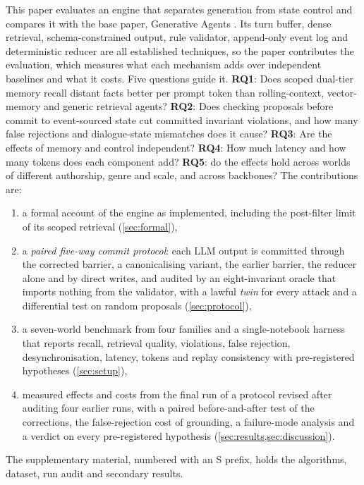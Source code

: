 \documentclass[letterpaper,journal]{IEEEtran}
\begin{document}
This paper evaluates an engine that separates generation from state control and compares it with the base paper, Generative Agents \cite{park2023generative}. Its turn buffer, dense retrieval, schema-constrained output, rule validator, append-only event log and deterministic reducer are all established techniques, so the paper contributes the evaluation, which measures what each mechanism adds over independent baselines and what it costs. Five questions guide it. \textbf{RQ1}: Does scoped dual-tier memory recall distant facts better per prompt token than rolling-context, vector-memory and generic retrieval agents? \textbf{RQ2}: Does checking proposals before commit to event-sourced state cut committed invariant violations, and how many false rejections and dialogue-state mismatches does it cause? \textbf{RQ3}: Are the effects of memory and control independent? \textbf{RQ4}: How much latency and how many tokens does each component add? \textbf{RQ5}: do the effects hold across worlds of different authorship, genre and scale, and across backbones? The contributions are:
\begin{enumerate}[leftmargin=*]
  \item a formal account of the engine as implemented, including the post-filter limit of its scoped retrieval (\cref{sec:formal}),
  \item a \emph{paired five-way commit protocol}: each LLM output is committed through the corrected barrier, a canonicalising variant, the earlier barrier, the reducer alone and by direct writes, and audited by an eight-invariant oracle that imports nothing from the validator, with a lawful \emph{twin} for every attack and a differential test on random proposals (\cref{sec:protocol}),
  \item a seven-world benchmark from four families and a single-notebook harness that reports recall, retrieval quality, violations, false rejection, desynchronisation, latency, tokens and replay consistency with pre-registered hypotheses (\cref{sec:setup}),
  \item measured effects and costs from the final run of a protocol revised after auditing four earlier runs, with a paired before-and-after test of the corrections, the false-rejection cost of grounding, a failure-mode analysis and a verdict on every pre-registered hypothesis (\cref{sec:results,sec:discussion}).
\end{enumerate}
The supplementary material, numbered with an S prefix, holds the algorithms, dataset, run audit and secondary results.
\end{document}
